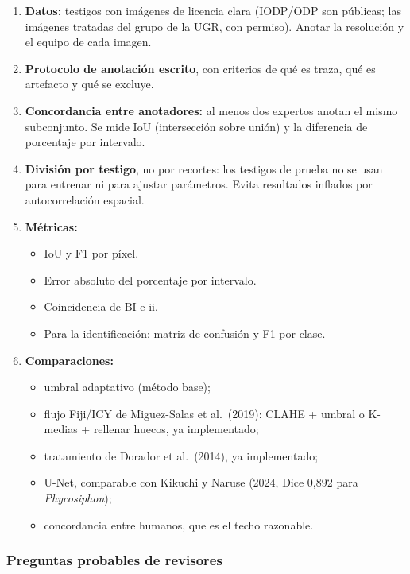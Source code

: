 \documentclass[
  10pt,
]{article}
\providecommand{\tightlist}{%
  \setlength{\itemsep}{0pt}\setlength{\parskip}{0pt}}
\begin{document}
\begin{enumerate}
\def\labelenumi{\arabic{enumi}.}
\tightlist
\item
  \textbf{Datos:} testigos con imágenes de licencia clara (IODP/ODP son
  públicas; las imágenes tratadas del grupo de la UGR, con permiso).
  Anotar la resolución y el equipo de cada imagen.
\item
  \textbf{Protocolo de anotación escrito}, con criterios de qué es
  traza, qué es artefacto y qué se excluye.
\item
  \textbf{Concordancia entre anotadores:} al menos dos expertos anotan
  el mismo subconjunto. Se mide IoU (intersección sobre unión) y la
  diferencia de porcentaje por intervalo.
\item
  \textbf{División por testigo}, no por recortes: los testigos de prueba
  no se usan para entrenar ni para ajustar parámetros. Evita resultados
  inflados por autocorrelación espacial.
\item
  \textbf{Métricas:}

  \begin{itemize}
  \tightlist
  \item
    IoU y F1 por píxel.
  \item
    Error absoluto del porcentaje por intervalo.
  \item
    Coincidencia de BI e ii.
  \item
    Para la identificación: matriz de confusión y F1 por clase.
  \end{itemize}
\item
  \textbf{Comparaciones:}

  \begin{itemize}
  \tightlist
  \item
    umbral adaptativo (método base);
  \item
    flujo Fiji/ICY de Miguez-Salas et al.~(2019): CLAHE + umbral o
    K-medias + rellenar huecos, ya implementado;
  \item
    tratamiento de Dorador et al.~(2014), ya implementado;
  \item
    U-Net, comparable con Kikuchi y Naruse (2024, Dice 0,892 para
    \emph{Phycosiphon});
  \item
    concordancia entre humanos, que es el techo razonable.
  \end{itemize}
\end{enumerate}

\hypertarget{preguntas-probables-de-revisores}{%
\subsubsection{Preguntas probables de
revisores}\label{preguntas-probables-de-revisores}}
\end{document}
